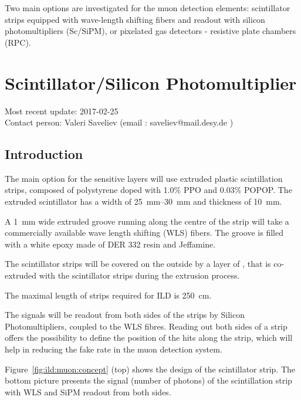 Two main options are investigated for the muon detection elements: scintillator strips equipped with wave-length shifting fibers and readout with silicon photomultipliers (Sc/SiPM), or pixelated gas detectors - resistive plate chambers (RPC).

\section{Scintillator/Silicon Photomultiplier}
Most recent update: 2017-02-25 \\
Contact person: Valeri Saveliev (email : saveliev@mail.desy.de )

\subsection{Introduction}
The main option for the sensitive layers will use extruded plastic scintillation strips, composed of polystyrene doped with 1.0\% PPO and 0.03\% POPOP.
The extruded scintillator has a width of \SIrange{25}{30}{mm} and thickness of \SI{10}{mm}.

A \SI{1}{mm} wide extruded groove running along the centre of the strip will take a commercially available wave length shifting (WLS) fibers.
The groove is filled with a white epoxy made of DER 332 resin and Jeffamine.

The scintillator strips will be covered on the outside by a layer of , that is co-extruded with the scintillator strips during the extrusion process.

The maximal length of strips required for ILD is \SI{250}{cm}.

The signals will be readout from both sides of the strips by Silicon Photomultipliers, coupled to the WLS fibres.
Reading out both sides of a strip offers the possibility to define the position of the hits along the strip, which will help in reducing the fake rate in the muon detection system.

Figure~\ref{fig:ild:muon:concept} (top) shows the design of the scintillator strip. The bottom picture presents the signal (number of photons) of the scintillation strip with WLS and SiPM readout from both sides.

